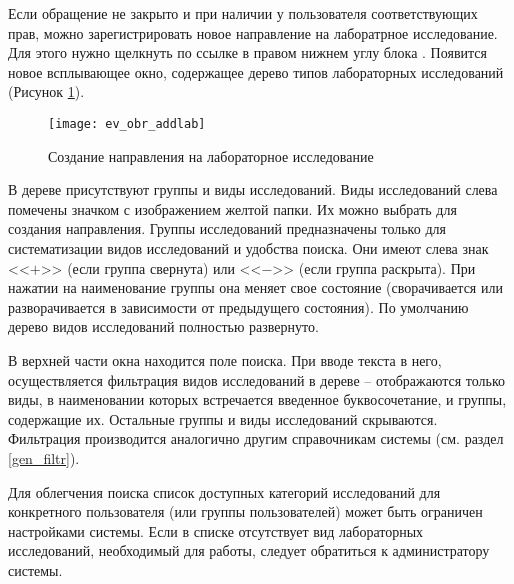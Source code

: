 {Если обращение не закрыто и при наличии у пользователя соответствующих прав, можно зарегистрировать новое направление на лаборатрное исследование. Для этого нужно щелкнуть по ссылке  в правом нижнем углу блока . Появится новое всплывающее окно, содержащее дерево типов лабораторных исследований (Рисунок \ref{img_ev_obr_addlab}).

\begin{figure}[ht]\centering
 \texttt{[image: ev\_obr\_addlab]}
 \caption{Создание направления на лабораторное исследование}
 \label{img_ev_obr_addlab}
\end{figure}

В дереве присутствуют группы и виды исследований. Виды исследований слева помечены значком с изображением желтой папки. Их можно выбрать для создания направления. Группы исследований предназначены только для систематизации видов исследований и удобства поиска. Они имеют слева знак <<$+$>> (если группа свернута) или <<$-$>> (если группа раскрыта). При нажатии на наименование группы она меняет свое состояние (сворачивается или разворачивается в зависимости от предыдущего состояния). По умолчанию дерево видов исследований полностью развернуто. 

В верхней части окна находится поле поиска. При вводе текста в него, осуществляется фильтрация видов исследований в дереве -- отображаются только виды, в наименовании которых встречается введенное буквосочетание, и группы, содержащие их. Остальные  группы и виды исследований скрываются. Фильтрация производится аналогично другим справочникам системы (см. раздел \ref{gen_filtr}). 



\begin{prim}
 Для облегчения поиска список доступных категорий исследований для конкретного пользователя (или группы пользователей) может быть ограничен настройками системы. Если в списке отсутствует вид лабораторных исследований, необходимый для работы, следует обратиться к администратору системы.
\end{prim} 

}
